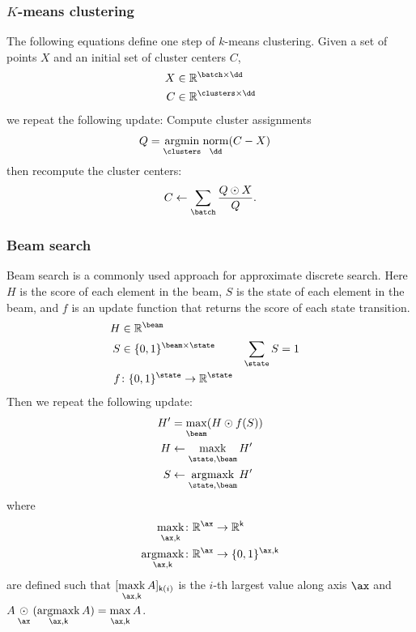 \documentclass{article}
\newcommand{\reals}{\mathbb{R}}
\begin{document}
\subsubsection{$K$-means clustering}


The following equations define one step of $k$-means clustering. Given a set of points $X$ and an initial set of cluster centers $C$,
\begin{align*}
  X &\in \reals^{\batch \times \dd} \\
C &\in \reals^{\clusters \times \dd}
\end{align*}
we repeat the following update: Compute cluster assignments
\begin{align*}
Q &= \nfun{\clusters}{argmin} \nfun{\dd}{norm}(C-X)
\end{align*}
then recompute the cluster centers:
\begin{equation*}
C \leftarrow \nsum{\batch} \frac{Q \odot X}{Q}.
\end{equation*}

\subsubsection{Beam search}


Beam search is a commonly used approach for approximate discrete search. Here $H$ is the score of each element in the beam, $S$ is the state of each element in the beam, and $f$ is an update function that returns the score of each state transition. 
\begin{align*} 
H &\in \reals^{\beam} \\
S &\in \{0, 1\}^{\beam \times \state} & \nsum{\state} S &= 1 \\
f &\colon \{0, 1\}^{\state} \rightarrow \reals^{\state} \\
\end{align*}
Then we repeat the following update:
\begin{align*}
H' &= \nfun{\beam}{max} (H \odot f(S)) \\
H &\leftarrow \nfun{\state,\beam}{maxk} H' \\
S &\leftarrow \nfun{\state,\beam}{argmaxk} H'
\end{align*}
where
\begin{align*}
\nfun{\ax,\name{k}}{maxk} \colon \reals^{\ax} &\rightarrow \reals^{\name{k}} \\
\nfun{\ax,\name{k}}{argmaxk} \colon \reals^{\ax} &\rightarrow \{0,1\}^{\ax,\name{k}}
\end{align*}
are defined such that $[\nfun{\ax,\name{k}}{maxk} A]_{\name{k}(i)}$ is the $i$-th largest value along axis $\ax$ and $A \ndot{\ax} (\nfun{\ax,\name{k}}{argmaxk}{A}) = \nfun{\ax,\name{k}}{max} A$.
\end{document}
